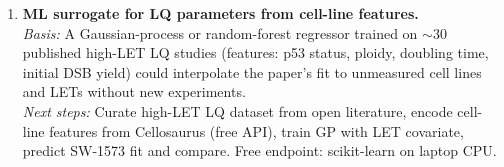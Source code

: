 \begin{enumerate}
\item \textbf{ML surrogate for LQ parameters from cell-line features.}\\
      \emph{Basis:} A Gaussian-process or random-forest regressor trained
      on $\sim$30 published high-LET LQ studies (features: p53 status,
      ploidy, doubling time, initial DSB yield) could interpolate the
      paper's fit to unmeasured cell lines and LETs without new
      experiments.\\
      \emph{Next steps:} Curate high-LET LQ dataset from open literature,
      encode cell-line features from Cellosaurus (free API), train GP
      with LET covariate, predict SW-1573 fit and compare. Free endpoint:
      scikit-learn on laptop CPU.

\end{enumerate}
